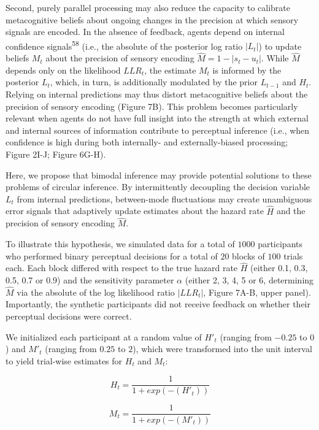 \documentclass[
]{article}
\begin{document}
Second, purely parallel processing may also reduce the capacity to
calibrate metacognitive beliefs about ongoing changes in the precision
at which sensory signals are encoded. In the absence of feedback, agents
depend on internal confidence signals\textsuperscript{58} (i.e., the
absolute of the posterior log ratio \(|L_t|\)) to update beliefs \(M_t\)
about the precision of sensory encoding \(\hat{M} = 1 - |s_t-u_t|\).
While \(\hat{M}\) depends only on the likelihood \(LLR_t\), the estimate
\(M_t\) is informed by the posterior \(L_t\), which, in turn, is
additionally modulated by the prior \(L_{t-1}\) and \(H_t\). Relying on
internal predictions may thus distort metacognitive beliefs about the
precision of sensory encoding (Figure 7B). This problem becomes
particularly relevant when agents do not have full insight into the
strength at which external and internal sources of information
contribute to perceptual inference (i.e., when confidence is high during
both internally- and externally-biased processing; Figure 2I-J; Figure
6G-H).

Here, we propose that bimodal inference may provide potential solutions
to these problems of circular inference. By intermittently decoupling
the decision variable \(L_t\) from internal predictions, between-mode
fluctuations may create unambiguous error signals that adaptively update
estimates about the hazard rate \(\hat{H}\) and the precision of sensory
encoding \(\hat{M}\).

To illustrate this hypothesis, we simulated data for a total of \(1000\)
participants who performed binary perceptual decisions for a total of
\(20\) blocks of \(100\) trials each. Each block differed with respect
to the true hazard rate \(\hat{H}\) (either 0.1, 0.3, 0.5, 0.7 or 0.9)
and the sensitivity parameter \(\alpha\) (either 2, 3, 4, 5 or 6,
determining \(\hat{M}\) via the absolute of the log likelihood ratio
\(|LLR_t|\), Figure 7A-B, upper panel). Importantly, the synthetic
participants did not receive feedback on whether their perceptual
decisions were correct.

We initialized each participant at a random value of \(H'_t\) (ranging
from \(-0.25\) to \(0\)) and \(M'_t\) (ranging from \(0.25\) to \(2\)),
which were transformed into the unit interval to yield trial-wise
estimates for \(H_t\) and \(M_t\):

\begin{equation}
H_t = \frac{1}{1+exp(-(H'_t))}
\end{equation}

\begin{equation}
M_t = \frac{1}{1+exp(-(M'_t))}
\end{equation}
\end{document}
